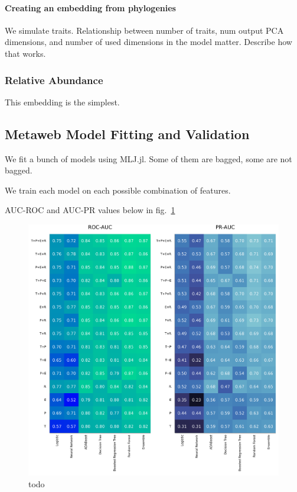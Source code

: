 \documentclass[11pt]{article}
\makeatletter
\def\maxwidth{\ifdim\Gin@nat@width>\linewidth\linewidth
\else\Gin@nat@width\fi}
\let\Oldincludegraphics\includegraphics
\renewcommand{\includegraphics}[1]{\Oldincludegraphics[width=\maxwidth]{#1}}
\makeatother
\begin{document}
\hypertarget{creating-an-embedding-from-phylogenies}{%
\paragraph{Creating an embedding from
phylogenies}\label{creating-an-embedding-from-phylogenies}}

We simulate traits. Relationship between number of traits, num output
PCA dimensions, and number of used dimensions in the model matter.
Describe how that works.

\hypertarget{relative-abundance}{%
\subsubsection{Relative Abundance}\label{relative-abundance}}

This embedding is the simplest.

\hypertarget{metaweb-model-fitting-and-validation}{%
\subsection{Metaweb Model Fitting and
Validation}\label{metaweb-model-fitting-and-validation}}

We fit a bunch of models using MLJ.jl. Some of them are bagged, some are
not bagged.

We train each model on each possible combination of features.

AUC-ROC and AUC-PR values below in fig.~\ref{fig:prroc}

\begin{figure}
\hypertarget{fig:prroc}{%
\centering
\includegraphics{./figures/PR_ROC.png}
\caption{todo}\label{fig:prroc}
}
\end{figure}
\end{document}
